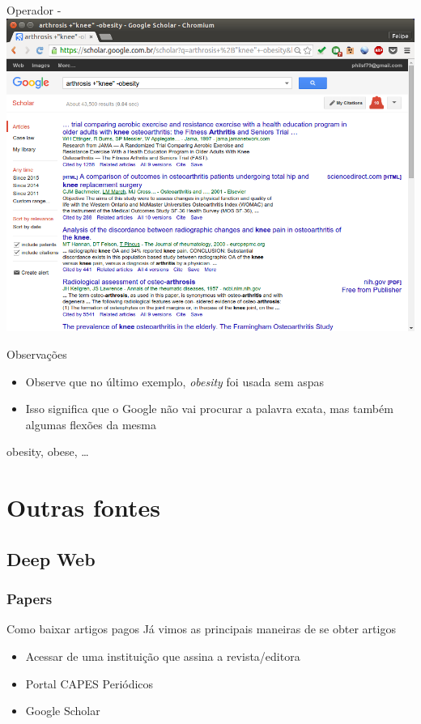 \documentclass{beamer}
\begin{document}
\begin{frame}{Operador -}
  \includegraphics[height=.85\textheight]{Busca/google-fu-plusminus}
\end{frame}

\begin{frame}{Observações}
  \begin{itemize}
  \item Observe que no último exemplo, {\em obesity} foi usada sem
    aspas
  \item Isso significa que o Google não vai procurar a palavra
    \alert{exata}, mas também algumas flexões da mesma
  \end{itemize}
  \begin{example}
    obesity, obese, \ldots
  \end{example}
\end{frame}

\section{Outras fontes}

\subsection{Deep Web}

\subsubsection{Papers}

\begin{frame}{Como baixar artigos pagos}
Já vimos as principais maneiras de se obter artigos
  \begin{itemize}
  \item Acessar de uma instituição que assina a revista/editora
  \item Portal CAPES Periódicos
  \item Google Scholar
  \end{itemize}
\end{frame}
\end{document}
